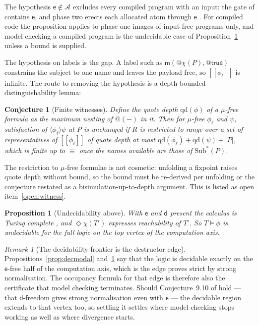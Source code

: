 \documentclass[11pt]{article}
\makeatletter
\theoremstyle{plain}
\newtheorem{proposition}[theorem]{Proposition}
\newtheorem{conjecture}[theorem]{Conjecture}
\theoremstyle{definition}
\theoremstyle{remark}
\newtheorem{remark}[theorem]{Remark}
\newcommand{\quo}[1]{@#1}
\newcommand{\mm}{\mathsf{m}}
\newcommand{\dd}{\mathsf{d}}
\newcommand{\ev}{\mathsf{e}}
\newcommand{\scong}{\equiv}
\newcommand{\may}[1]{\langle #1 \rangle}
\newcommand{\sat}{\models}
\newcommand{\chf}[1]{\chi(#1)}
\newcommand{\Atm}{\mathcal{A}}
\newcommand{\Sub}[1]{\mathrm{Sub}^{*}(#1)}
\newcommand{\fix}{\mu}
\newcommand{\sem}[1]{[\![#1]\!]}
\makeatother
\begin{document}
The hypothesis $\ev \notin \Atm$ excludes every compiled program with an
input: the gate of \cite[Lem.~6.2]{rhocomb3} contains $\ev$, and phase two
erects each allocated atom through $\ev$ \cite[Rem.~3.11]{rhocomb3}. For
compiled code the proposition applies to phase-one images of input-free
programs only, and model checking a compiled program is the undecidable case of
Proposition~\ref{prop:undec} unless a bound is supplied.

The hypothesis on labels is the gap. A label such as
$\mm(\quo{\chf{P}},\quo{\mathsf{true}})$ constrains the subject to one name and
leaves the payload free, so $\sem{\phi_{\ell}}$ is infinite. The route to
removing the hypothesis is a depth-bounded distinguishability lemma:

\begin{conjecture}[Finite witnesses]
\label{conj:witness}
Define the quote depth $\mathrm{qd}(\phi)$ of a $\fix$-free formula as the
maximum nesting of $\quo{(-)}$ in it. Then for $\fix$-free $\phi_{\ell}$ and
$\psi$, satisfaction of $\may{\phi_{\ell}}\psi$ at $P$ is unchanged if $R$ is
restricted to range over a set of representatives of $\sem{\phi_{\ell}}$ of
quote depth at most $\mathrm{qd}(\phi_{\ell}) + \mathrm{qd}(\psi) + |P|$, which
is finite up to $\scong$ once the names available are those of $\Sub{P}$.
\end{conjecture}

The restriction to $\fix$-free formulae is not cosmetic: unfolding a fixpoint
raises quote depth without bound, so the bound must be re-derived per unfolding
or the conjecture restated as a bisimulation-up-to-depth argument. This is
listed as open item~\ref{open:witness}.

\begin{proposition}[Undecidability above]
\label{prop:undec}
With $\ev$ and $\dd$ present the calculus is Turing complete
\cite[\S7]{rhocomb3}, and $\Diamond \chf{T'}$ expresses reachability of $T'$.
So $T \sat \phi$ is undecidable for the full logic on the top vertex of the
computation axis.
\end{proposition}

\begin{remark}[The decidability frontier is the destructor edge]
\label{rem:frontier}
Propositions~\ref{prop:decmodal} and~\ref{prop:undec} say that the logic is
decidable exactly on the $\ev$-free half of the computation axis, which is the
edge \cite[Prop.~9.9]{rhocomb3} proves strict by strong normalisation. The
occupancy formula for that edge is therefore also the certificate that model
checking terminates. Should Conjecture~9.10 of \cite{rhocomb3} hold --- that
$\dd$-freedom gives strong normalisation even with $\ev$ --- the decidable
region extends to that vertex too, so settling it settles where model checking
stops working as well as where divergence starts.
\end{remark}
\end{document}
